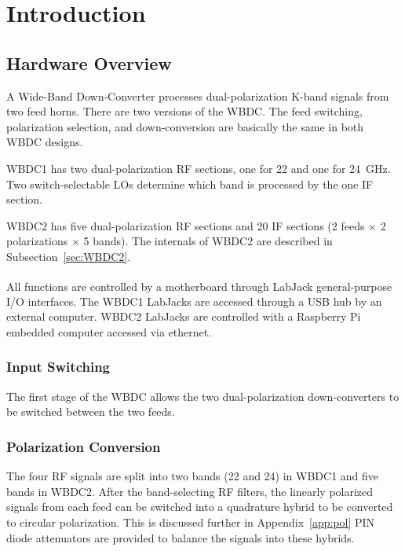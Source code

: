 \documentclass[letterpaper,11pt]{book}
\begin{document}
\mainmatter
\chapter{Introduction}\label{chap:intro}

\section{Hardware Overview}

A Wide-Band Down-Converter processes dual-polarization K-band signals from two
feed horns. There are two versions of the WBDC.
The feed switching, polarization selection, and down-conversion are basically 
the same in both WBDC designs.

WBDC1 has two dual-polarization RF sections, one for 22 and one for 24~GHz.
Two switch-selectable LOs determine which band is processed by the one IF section. 

WBDC2 has five dual-polarization RF sections and 20 IF 
sections (2 feeds $\times$ 2 polarizations $\times$ 5 bands).
The internals of WBDC2 are described in Subsection~\ref{sec:WBDC2}.

All functions are controlled by a motherboard
through LabJack\textsuperscript{\textregistered} general-purpose I/O 
interfaces.
The WBDC1 LabJacks are accessed through a USB hub by an external computer.  
WBDC2 LabJacks are controlled with a Raspberry Pi embedded computer accessed 
via ethernet.

\subsection{Input Switching}

The first stage of the WBDC allows the two dual-polarization down-converters to
be switched between the two feeds.  

\subsection{Polarization Conversion}

The four RF signals are split into two bands (22 and 24) in WBDC1 and five bands
in WBDC2.  After the band-selecting 
RF filters, the linearly polarized signals from each
feed can be switched into a quadrature hybrid  to be
converted to circular
polarization.  This is discussed further in Appendix~\ref{app:pol} 
PIN diode attenuators are provided  to balance the 
signals into
these hybrids.
\end{document}
